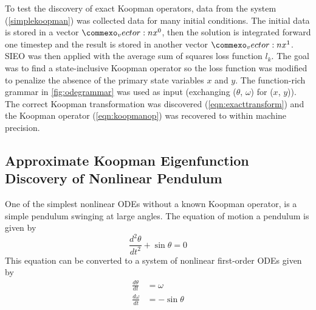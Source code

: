 \documentclass{article}
\renewcommand{\vec}[1]{\vect{#1}}
\begin{document}
To test the discovery of exact Koopman operators, data from the system (\cref{simplekoopman}) was collected data for many initial conditions. The initial data is stored in a vector $\vec{x}^0$, then the solution is integrated forward one timestep and the result is stored in another vector $\vec{x}^1$. SIEO was then applied with the average sum of squares loss function $l_k$. The goal was to find a state-inclusive Koopman operator so the loss function was modified to penalize the absence of the primary state variables $x$ and $y$. The function-rich grammar in \cref{fig:odegrammar} was used as input (exchanging ($\theta$, $\omega$) for ($x$, $y$)). The correct Koopman transformation was discovered (\cref{eqn:exacttransform}) and the Koopman operator (\cref{eqn:koopmanop}) was recovered to within machine precision.







\subsection{Approximate Koopman Eigenfunction Discovery of Nonlinear Pendulum}
One of the simplest nonlinear ODEs without a known Koopman operator, is a simple pendulum swinging at large angles. The equation of motion a pendulum is given by
\begin{equation}
\frac{d^2 \theta}{d t^2} + \sin \theta = 0 \end{equation}
This equation can be converted to a system of nonlinear first-order ODEs given by
\begin{align}
\frac{d\theta}{dt} &= \omega \\
\frac{d\omega}{dt} &= -\sin \theta
\end{align}
\end{document}
